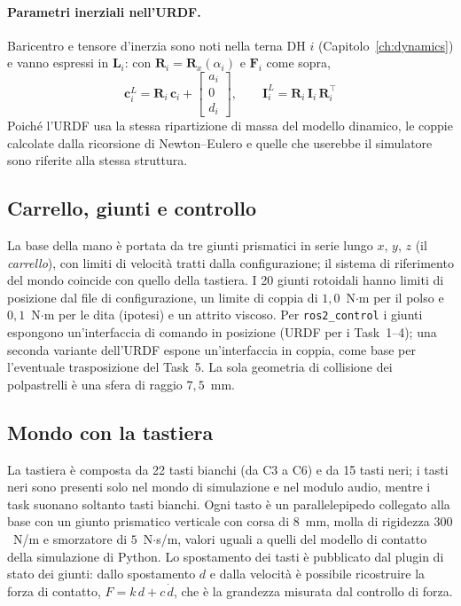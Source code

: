 \paragraph{Parametri inerziali nell'URDF.} Baricentro e tensore d'inerzia sono noti nella terna DH $i$ (Capitolo~\ref{ch:dynamics}) e vanno espressi in $\boldsymbol L_i$: con $\boldsymbol R_i=\boldsymbol R_x(\alpha_i)$ e $\boldsymbol F_i$ come sopra,
\begin{equation}
    \boldsymbol c^{L}_i=\boldsymbol R_i\,\boldsymbol c_i+\begin{bmatrix}a_i\\0\\d_i\end{bmatrix},\qquad
    \boldsymbol I^{L}_i=\boldsymbol R_i\,\boldsymbol I_i\,\boldsymbol R_i^\top
\end{equation}
Poiché l'URDF usa la stessa ripartizione di massa del modello dinamico, le coppie calcolate dalla ricorsione di Newton--Eulero e quelle che userebbe il simulatore sono riferite alla stessa struttura.

\subsection{Carrello, giunti e controllo}

La base della mano è portata da tre giunti prismatici in serie lungo $x$, $y$, $z$ (il \emph{carrello}), con limiti di velocità tratti dalla configurazione; il sistema di riferimento del mondo coincide con quello della tastiera. I 20 giunti rotoidali hanno limiti di posizione dal file di configurazione, un limite di coppia di $1{,}0$~N$\cdot$m per il polso e $0{,}1$~N$\cdot$m per le dita (ipotesi) e un attrito viscoso. Per \texttt{ros2\_control} i giunti espongono un'interfaccia di comando in posizione (URDF per i Task~1--4); una seconda variante dell'URDF espone un'interfaccia in coppia, come base per l'eventuale trasposizione del Task~5. La sola geometria di collisione dei polpastrelli è una sfera di raggio $7{,}5$~mm.

\subsection{Mondo con la tastiera}

La tastiera è composta da 22 tasti bianchi (da C3 a C6) e da 15 tasti neri; i tasti neri sono presenti solo nel mondo di simulazione e nel modulo audio, mentre i task suonano soltanto tasti bianchi. Ogni tasto è un parallelepipedo collegato alla base con un giunto prismatico verticale con corsa di $8$~mm, molla di rigidezza $300$~N/m e smorzatore di $5$~N$\cdot$s/m, valori uguali a quelli del modello di contatto della simulazione di Python. Lo spostamento dei tasti è pubblicato dal plugin di stato dei giunti: dallo spostamento $d$ e dalla velocità è possibile ricostruire la forza di contatto, $F=k\,d+c\,\dot d$, che è la grandezza misurata dal controllo di forza.

